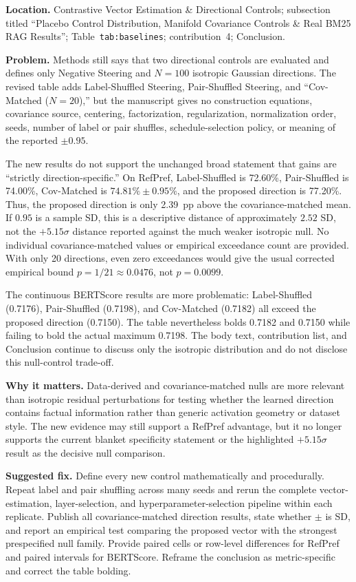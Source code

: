\documentclass[11pt]{article}
\newcommand{\findinglabel}[1]{\textbf{#1}}
\begin{document}
\findinglabel{Location.} Contrastive Vector Estimation \& Directional Controls; subsection titled ``Placebo Control Distribution, Manifold Covariance Controls \& Real BM25 RAG Results''; Table~\texttt{tab:baselines}; contribution~4; Conclusion.

\findinglabel{Problem.} Methods still says that two directional controls are evaluated and defines only Negative Steering and $N=100$ isotropic Gaussian directions.  The revised table adds Label-Shuffled Steering, Pair-Shuffled Steering, and ``Cov-Matched ($N=20$),'' but the manuscript gives no construction equations, covariance source, centering, factorization, regularization, normalization order, seeds, number of label or pair shuffles, schedule-selection policy, or meaning of the reported $\pm0.95$.

The new results do not support the unchanged broad statement that gains are ``strictly direction-specific.''  On RefPref, Label-Shuffled is 72.60\%, Pair-Shuffled is 74.00\%, Cov-Matched is $74.81\%\pm0.95\%$, and the proposed direction is 77.20\%.  Thus, the proposed direction is only 2.39~pp above the covariance-matched mean.  If $0.95$ is a sample SD, this is a descriptive distance of approximately $2.52$ SD, not the $+5.15\sigma$ distance reported against the much weaker isotropic null.  No individual covariance-matched values or empirical exceedance count are provided.  With only 20 directions, even zero exceedances would give the usual corrected empirical bound $p=1/21\approx0.0476$, not $p=0.0099$.

The continuous BERTScore results are more problematic: Label-Shuffled (0.7176), Pair-Shuffled (0.7198), and Cov-Matched (0.7182) all exceed the proposed direction (0.7150).  The table nevertheless bolds 0.7182 and 0.7150 while failing to bold the actual maximum 0.7198.  The body text, contribution list, and Conclusion continue to discuss only the isotropic distribution and do not disclose this null-control trade-off.

\findinglabel{Why it matters.} Data-derived and covariance-matched nulls are more relevant than isotropic residual perturbations for testing whether the learned direction contains factual information rather than generic activation geometry or dataset style.  The new evidence may still support a RefPref advantage, but it no longer supports the current blanket specificity statement or the highlighted $+5.15\sigma$ result as the decisive null comparison.

\findinglabel{Suggested fix.} Define every new control mathematically and procedurally.  Repeat label and pair shuffling across many seeds and rerun the complete vector-estimation, layer-selection, and hyperparameter-selection pipeline within each replicate.  Publish all covariance-matched direction results, state whether $\pm$ is SD, and report an empirical test comparing the proposed vector with the strongest prespecified null family.  Provide paired cells or row-level differences for RefPref and paired intervals for BERTScore.  Reframe the conclusion as metric-specific and correct the table bolding.
\end{document}
